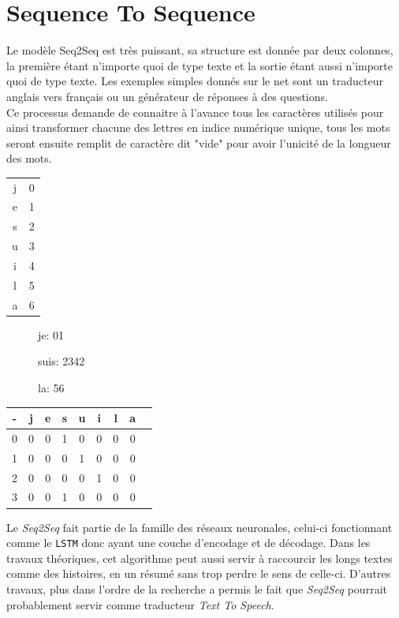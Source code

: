 \section{Sequence To Sequence}
Le modèle Seq2Seq est très puissant, sa structure est donnée par deux colonnes, la première étant n'importe quoi de type texte et la sortie étant aussi n'importe quoi de type texte. Les exemples simples donnés sur le net sont un traducteur anglais vers français ou un générateur de réponses à des questions.\\
\linebreak
Ce processus demande de connaitre à l'avance tous les caractères utilisés pour ainsi transformer chacune des lettres en indice numérique unique, tous les mots seront ensuite remplit de caractère dit "vide" pour avoir l'unicité de la longueur des mots.\\

\begin{multicols}{3}
\begin{tabular}{c|c}
j & 0\\
e & 1\\
s & 2\\
u & 3\\
i & 4\\
l & 5\\
a & 6\\
\end{tabular}
\begin{description}
\item[] je: 01
\item[] suis: 2342
\item[] la: 56
\end{description}
\begin{tabular}{c|cccccccc}
- & j & e & s & u & i & l & a\\
\hline
0 & 0 & 0 & 1 & 0 & 0 & 0 & 0\\
1 & 0 & 0 & 0 & 1 & 0 & 0 & 0\\
2 & 0 & 0 & 0 & 0 & 1 & 0 & 0\\
3 & 0 & 0 & 1 & 0 & 0 & 0 & 0\\
\end{tabular}
\end{multicols}

Le \textit{Seq2Seq} fait partie de la famille des réseaux neuronales, celui-ci fonctionnant comme le \texttt{LSTM} donc ayant une couche d'encodage et de décodage.\linebreak
Dans les travaux théoriques, cet algorithme peut aussi servir à raccourcir les longs textes comme des histoires, en un résumé sans trop perdre le sens de celle-ci.\linebreak
D'autres travaux, plus dans l'ordre de la recherche a permis le fait que \textit{Seq2Seq} pourrait probablement servir comme traducteur \textit{Text To Speech}.

